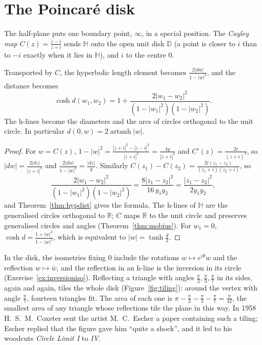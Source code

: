\section{The Poincar\'e disk}

The half-plane puts one boundary point, $\infty$, in a special position. The \emph{Cayley map} $C(z)=\frac{z-i}{z+i}$ sends $\mathbb H$ onto the open unit disk
$\mathbb D$ (a point is closer to $i$ than to $-i$ exactly when it lies in $\mathbb H$), and $i$ to the centre $0$.

\begin{proposition}\label{prop:disk}
Transported by $C$, the hyperbolic length element becomes $\frac{2|dw|}{1-|w|^2}$, and the distance becomes
\[
\cosh d(w_1,w_2)=1+\frac{2|w_1-w_2|^2}{(1-|w_1|^2)(1-|w_2|^2)}.
\]
The h-lines become the diameters and the arcs of circles orthogonal to the unit circle. In particular $d(0,w)=2\operatorname{artanh}|w|$.
\end{proposition}

\begin{proof}
For $w=C(z)$, $1-|w|^2=\frac{|z+i|^2-|z-i|^2}{|z+i|^2}=\frac{4y}{|z+i|^2}$ and $C'(z)=\frac{2i}{(z+i)^2}$, so $|dw|=\frac{2|dz|}{|z+i|^2}$ and
$\frac{2|dw|}{1-|w|^2}=\frac{|dz|}y$. Similarly $C(z_1)-C(z_2)=\frac{2i(z_1-z_2)}{(z_1+i)(z_2+i)}$, so
\[
\frac{2|w_1-w_2|^2}{(1-|w_1|^2)(1-|w_2|^2)}=\frac{8|z_1-z_2|^2}{16\,y_1y_2}=\frac{|z_1-z_2|^2}{2y_1y_2},
\]
and Theorem~\ref{thm:hypdist} gives the formula. The h-lines of $\mathbb H$ are the generalised circles orthogonal to $\mathbb R$; $C$ maps $\mathbb R$ to
the unit circle and preserves generalised circles and angles (Theorem~\ref{thm:mobius}). For $w_1=0$, $\cosh d=\frac{1+|w|^2}{1-|w|^2}$, which is
equivalent to $|w|=\tanh\frac d2$.
\end{proof}

In the disk, the isometries fixing $0$ include the rotations $w\mapsto e^{i\theta}w$ and the reflection $w\mapsto\bar w$, and the reflection in an h-line is
the inversion in its circle (Exercise~\ref{ex:inversioniso}). Reflecting a triangle with angles $\frac\pi2,\frac\pi3,\frac\pi7$ in its sides, again and
again, tiles the whole disk (Figure~\ref{fig:tiling}): around the vertex with angle $\frac\pi7$, fourteen triangles fit. The area of each one is
$\pi-\frac\pi2-\frac\pi3-\frac\pi7=\frac\pi{42}$, the smallest area of any triangle whose reflections tile the plane in this way. In 1958 H.~S.~M.~Coxeter sent
the artist M.~C.~Escher a paper containing such a tiling; Escher replied that the figure gave him ``quite a shock'', and it led to his woodcuts \emph{Circle
Limit I} to \emph{IV}.

